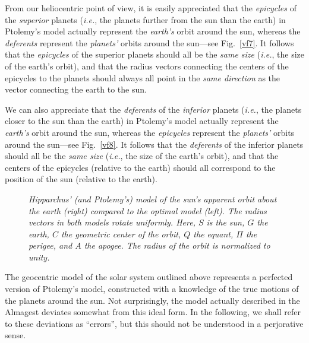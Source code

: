 From our heliocentric point of view, it is easily appreciated that the {\em epicycles}\/
of the {\em superior}\/ planets  ({\em i.e.}, the planets further from the sun than
the earth) in Ptolemy's model actually represent the {\em earth's}\/ orbit around the sun, whereas the
{\em deferents}\/ represent the {\em planets'}\/ orbits around the sun---see Fig.~\ref{vf7}.
It follows that the {\em epicycles}\/ of the superior planets should all be the {\em same size}\/ ({\em i.e.},
the size of the earth's orbit), and that the radius vectors connecting
the centers of the epicycles to the planets should always all  point
in the {\em same direction}\/ as the vector connecting the earth to the sun.

We can also appreciate that the {\em deferents}\/ of the {\em inferior}\/
planets ({\em i.e.}, the planets closer to the sun than
the earth) in Ptolemy's model actually represent the {\em earth's}\/ orbit around the sun, whereas the
{\em epicycles}\/ represent the {\em planets'}\/ orbits around the sun---see Fig.~\ref{vf8}. 
It follows that the {\em deferents}\/ of the inferior planets should all be the
{\em same size}\/ ({\em i.e.}, the size of the earth's orbit), and that the
centers of the epicycles (relative to the earth) should all correspond to the position of the sun (relative to the earth). 

\begin{figure}
\centerline{}
\caption[{\em Ptolemy's solar model.}]{\em Hipparchus' (and Ptolemy's) model of the sun's apparent orbit  about the earth (right) compared to the optimal  model (left).  The
radius vectors in both models rotate uniformly. Here, $S$ is the sun, $G$ the earth, $C$ the geometric center of the orbit, $Q$ the equant, $\Pi$ the perigee, and $A$ the apogee. The radius of the orbit is normalized to unity.}\label{fsun}   
\end{figure}

The geocentric model of the solar system outlined above represents a perfected version
of Ptolemy's model, constructed with 
a knowledge of the true motions of the planets around the sun.
Not surprisingly, the  model actually described in the Almagest deviates
somewhat from this ideal form. In the following, we shall
refer to these deviations as ``errors'', but this should not be understood
in a perjorative sense.

